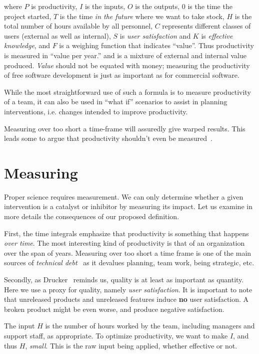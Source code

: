 \documentclass[sigconf, authorversion, nonacm]{acmart}
\begin{document}
\noindent where $P$ is productivity, $I$ is the inputs, $O$ is the outputs, $0$
is the time the project started, $T$ is the time \emph{in the future} where we
want to take stock, $H$ is the total number of hours available by all personnel,
$C$ represents different classes of users (external as well as internal), $S$ is
\emph{user satisfaction} and $K$ is \emph{effective knowledge}, and $F$ is a
weighing function that indicates ``value''.  Thus productivity is
measured in ``value per year.''  and is a mixture of external and internal
value produced. \emph{Value} should not be equated with money; measuring
the productivity of free software development is just as important as for
commercial software.

While the most straightforward use of such a formula is to measure productivity
of a team, it can also be used in ``what if'' scenarios to assist in planning
interventions, i.e. changes intended to improve productivity.

Measuring over too short a time-frame will assuredly give
warped results. This leads some to argue that productivity shouldn't even
be measured~\cite{Ko2019}.

\section{Measuring}

Proper science requires measurement.  We can only determine whether a given
intervention is a catalyst or inhibitor by measuring its impact.  Let us
examine in more details the consequences of our proposed definition.

First, the time integrals emphasize that productivity is something that happens
\emph{over time}. The most interesting kind of productivity is that of an
organization over the span of years. Measuring over too short a time frame is
one of the main sources of \emph{technical debt}~\cite{KruchtenEtAl2012} as it
devalues planning, team work, being strategic, etc.

Secondly, as Drucker~\cite{Drucker1999} reminds us, quality is at least as
important as quantity. Here we use a proxy for quality, namely
\emph{user satisfaction}. It is important to note that unreleased products
and unreleased features induce \textbf{no} user satisfaction. A broken
product might be even worse, and produce negative satisfaction.

The input $H$ is the number of hours worked by the team, including managers
and support staff, as appropriate. To optimize productivity, we want to
make $I$, and thus $H$, \emph{small}. This is the raw input being applied,
whether effective or not.
\end{document}
